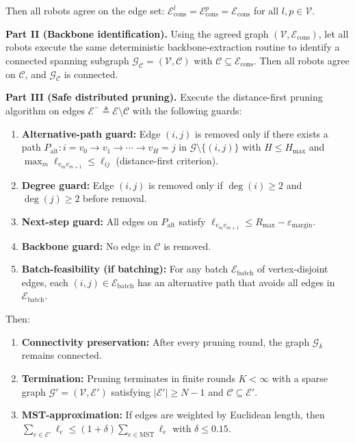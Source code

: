 \begin{theorem}
Then all robots agree on the edge set: $\mathcal{E}^l_{\mathrm{cons}}=\mathcal{E}^p_{\mathrm{cons}}=\mathcal{E}_{\mathrm{cons}}$ for all $l,p\in\mathcal{V}$.

\medskip
\noindent\textbf{Part II (Backbone identification).}
Using the agreed graph $(\mathcal{V},\mathcal{E}_{\mathrm{cons}})$, let all robots execute the same deterministic backbone-extraction routine to identify a connected spanning subgraph $\mathcal{G}_{\mathcal{C}}=(\mathcal{V},\mathcal{C})$ with $\mathcal{C}\subseteq\mathcal{E}_{\mathrm{cons}}$.
Then all robots agree on $\mathcal{C}$, and $\mathcal{G}_{\mathcal{C}}$ is connected.

\medskip
\noindent\textbf{Part III (Safe distributed pruning).}
Execute the distance-first pruning algorithm on edges $\mathcal{E}^-\triangleq\mathcal{E}\setminus\mathcal{C}$ with the following guards:
\begin{enumerate}[label=(\roman*)]
\item \textbf{Alternative-path guard:} Edge $(i,j)$ is removed only if there exists a path $P_{\mathrm{alt}}:i=v_0\to v_1\to\cdots\to v_H=j$ in $\mathcal{G}\setminus\{(i,j)\}$ with $H\le H_{\max}$ and $\max_{m}\ell_{v_m v_{m+1}}\le\ell_{ij}$ (distance-first criterion).
\item \textbf{Degree guard:} Edge $(i,j)$ is removed only if $\deg(i)\ge 2$ and $\deg(j)\ge 2$ before removal.
\item \textbf{Next-step guard:} All edges on $P_{\mathrm{alt}}$ satisfy $\ell_{v_m v_{m+1}}\le R_{\max}-\varepsilon_{\mathrm{margin}}$.
\item \textbf{Backbone guard:} No edge in $\mathcal{C}$ is removed.
\item \textbf{Batch-feasibility (if batching):} For any batch $\mathcal{E}_{\mathrm{batch}}$ of vertex-disjoint edges, each $(i,j)\in\mathcal{E}_{\mathrm{batch}}$ has an alternative path that avoids all edges in $\mathcal{E}_{\mathrm{batch}}$.
\end{enumerate}

Then:
\begin{enumerate}[label=\arabic*.]
\item \textbf{Connectivity preservation:} After every pruning round, the graph $\mathcal{G}_k$ remains connected.
\item \textbf{Termination:} Pruning terminates in finite rounds $K<\infty$ with a sparse graph $\mathcal{G}'=(\mathcal{V},\mathcal{E}')$ satisfying $|\mathcal{E}'|\ge N-1$ and $\mathcal{C}\subseteq\mathcal{E}'$.
\item \textbf{MST-approximation:} If edges are weighted by Euclidean length, then $\sum_{e\in\mathcal{E}'}\ell_e\le(1+\delta)\sum_{e\in\mathrm{MST}}\ell_e$ with $\delta\le 0.15$.
\end{enumerate}
\end{theorem}

